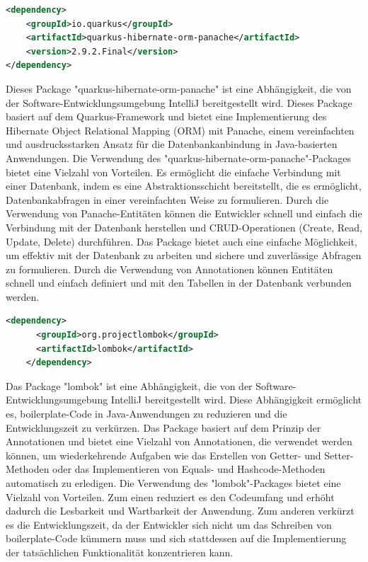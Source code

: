 \newpage
\begin{lstlisting}[language=XML,caption=Dependency | hibernate-orm-panache,label=lst:impl:foo]
    <dependency>
    <groupId>io.quarkus</groupId>
    <artifactId>quarkus-hibernate-orm-panache</artifactId>
    <version>2.9.2.Final</version>
</dependency>
\end{lstlisting}

Dieses Package "quarkus-hibernate-orm-panache" ist eine Abhängigkeit, die von der Software-Entwicklungsumgebung IntelliJ bereitgestellt wird. Dieses Package basiert auf dem Quarkus-Framework und bietet eine Implementierung des Hibernate Object Relational Mapping (ORM) mit Panache, einem vereinfachten und ausdrucksstarken Ansatz für die Datenbankanbindung in Java-basierten Anwendungen.
\newline
\newline
Die Verwendung des "quarkus-hibernate-orm-panache"-Packages bietet eine Vielzahl von Vorteilen. Es ermöglicht die einfache Verbindung mit einer Datenbank, indem es eine Abstraktionsschicht bereitstellt, die es ermöglicht, Datenbankabfragen in einer vereinfachten Weise zu formulieren. Durch die Verwendung von Panache-Entitäten können die Entwickler schnell und einfach die Verbindung mit der Datenbank herstellen und CRUD-Operationen (Create, Read, Update, Delete) durchführen.
\newline
\newline
Das Package bietet auch eine einfache Möglichkeit, um effektiv mit der Datenbank zu arbeiten und sichere und zuverlässige Abfragen zu formulieren. Durch die Verwendung von Annotationen können Entitäten schnell und einfach definiert und mit den Tabellen in der Datenbank verbunden werden.

\newpage
\begin{lstlisting}[language=XML,caption=Dependency | lombok,label=lst:impl:foo]
    <dependency>
      <groupId>org.projectlombok</groupId>
      <artifactId>lombok</artifactId>
    </dependency>
\end{lstlisting}

Das Package "lombok" ist eine Abhängigkeit, die von der Software-Entwicklungsumgebung IntelliJ bereitgestellt wird. Diese Abhängigkeit ermöglicht es, boilerplate-Code in Java-Anwendungen zu reduzieren und die Entwicklungszeit zu verkürzen.
\newline
\newline
Das Package basiert auf dem Prinzip der Annotationen und bietet eine Vielzahl von Annotationen, die verwendet werden können, um wiederkehrende Aufgaben wie das Erstellen von Getter- und Setter-Methoden oder das Implementieren von Equals- und Hashcode-Methoden automatisch zu erledigen.
\newline
\newline
Die Verwendung des "lombok"-Packages bietet eine Vielzahl von Vorteilen. Zum einen reduziert es den Codeumfang und erhöht dadurch die Lesbarkeit und Wartbarkeit der Anwendung. Zum anderen verkürzt es die Entwicklungszeit, da der Entwickler sich nicht um das Schreiben von boilerplate-Code kümmern muss und sich stattdessen auf die Implementierung der tatsächlichen Funktionalität konzentrieren kann.

